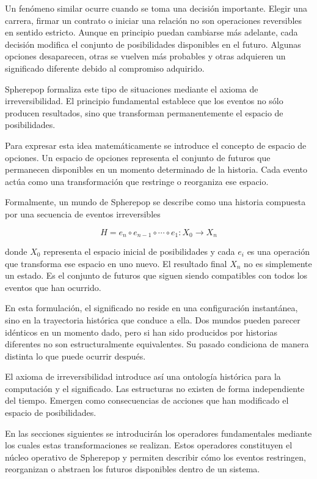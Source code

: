 \documentclass[12pt]{article}
\begin{document}
Un fenómeno similar ocurre cuando se toma una decisión importante. Elegir una carrera, firmar un contrato o iniciar una relación no son operaciones reversibles en sentido estricto. Aunque en principio puedan cambiarse más adelante, cada decisión modifica el conjunto de posibilidades disponibles en el futuro. Algunas opciones desaparecen, otras se vuelven más probables y otras adquieren un significado diferente debido al compromiso adquirido.

Spherepop formaliza este tipo de situaciones mediante el axioma de irreversibilidad. El principio fundamental establece que los eventos no sólo producen resultados, sino que transforman permanentemente el espacio de posibilidades.

Para expresar esta idea matemáticamente se introduce el concepto de espacio de opciones. Un espacio de opciones representa el conjunto de futuros que permanecen disponibles en un momento determinado de la historia. Cada evento actúa como una transformación que restringe o reorganiza ese espacio.

Formalmente, un mundo de Spherepop se describe como una historia compuesta por una secuencia de eventos irreversibles

\[
H = e_n \circ e_{n-1} \circ \cdots \circ e_1 : X_0 \rightarrow X_n
\]

donde \(X_0\) representa el espacio inicial de posibilidades y cada \(e_i\) es una operación que transforma ese espacio en uno nuevo. El resultado final \(X_n\) no es simplemente un estado. Es el conjunto de futuros que siguen siendo compatibles con todos los eventos que han ocurrido.

En esta formulación, el significado no reside en una configuración instantánea, sino en la trayectoria histórica que conduce a ella. Dos mundos pueden parecer idénticos en un momento dado, pero si han sido producidos por historias diferentes no son estructuralmente equivalentes. Su pasado condiciona de manera distinta lo que puede ocurrir después.

El axioma de irreversibilidad introduce así una ontología histórica para la computación y el significado. Las estructuras no existen de forma independiente del tiempo. Emergen como consecuencias de acciones que han modificado el espacio de posibilidades.

En las secciones siguientes se introducirán los operadores fundamentales mediante los cuales estas transformaciones se realizan. Estos operadores constituyen el núcleo operativo de Spherepop y permiten describir cómo los eventos restringen, reorganizan o abstraen los futuros disponibles dentro de un sistema.
\end{document}
